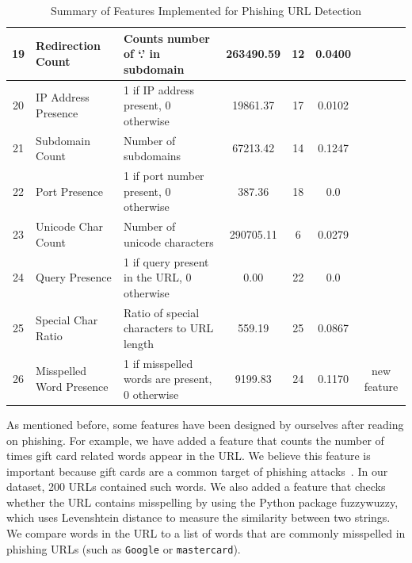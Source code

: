 \documentclass{article}
\begin{document}
\begin{table}[H]
\begin{adjustwidth}{-3cm}{}
\begin{tabular}{|c|p{4cm}|p{5cm}|c|c|c|c|}
                19           & Redirection Count               & Counts number of `.' in subdomain              & 263490.59          & 12                   & 0.0400                   &                                             \\ \hline
                20           & IP Address Presence             & 1 if IP address present, 0 otherwise           & 19861.37           & 17                   & 0.0102                   & ~\cite{PhishSafe,LexicalFeatureSelection}   \\ \hline
                21           & Subdomain Count                 & Number of subdomains                           & 67213.42           & 14                   & 0.1247                   & ~\cite{PhishSafe}                           \\ \hline
                22           & Port Presence                   & 1 if port number present, 0 otherwise          & 387.36             & 18                   & 0.0                      & ~\cite{LexicalFeatureSelection}             \\ \hline
                23           & Unicode Char Count              & Number of unicode characters                   & 290705.11          & 6                    & 0.0279                   & ~\cite{LexicalFeatureSelection}             \\ \hline
                24           & Query Presence                  & 1 if query present in the URL, 0 otherwise     & 0.00               & 22                   & 0.0                      & ~\cite{LexicalFeatureSelection}             \\ \hline
                25           & Special Char Ratio              & Ratio of special characters to URL length      & 559.19             & 25                   & 0.0867                   & ~\cite{PhishingLoginURLDetection} \\ \hline
                26           & Misspelled Word Presence        & 1 if misspelled words are present, 0 otherwise & 9199.83 & 24 & 0.1170 & new feature \\ \hline
            \end{tabular}
            \caption{Summary of Features Implemented for Phishing URL Detection}
            \label{tab:features}
        \end{adjustwidth}
    \end{table}

    As mentioned before, some features have been designed by ourselves after reading on phishing.
    For example, we have added a feature that counts the number of times gift card related words appear in the URL.
    We believe this feature is important because gift cards are a common target of phishing attacks~\cite{PhishingActivityTrendsReport}.
    In our dataset, 200 URLs contained such words.
    We also added a feature that checks whether the URL contains misspelling by using the Python package fuzzywuzzy, which uses Levenshtein distance to measure the similarity between two strings.
    We compare words in the URL to a list of words that are commonly misspelled in phishing URLs (such as \texttt{Google} or \texttt{mastercard}).
\end{document}
